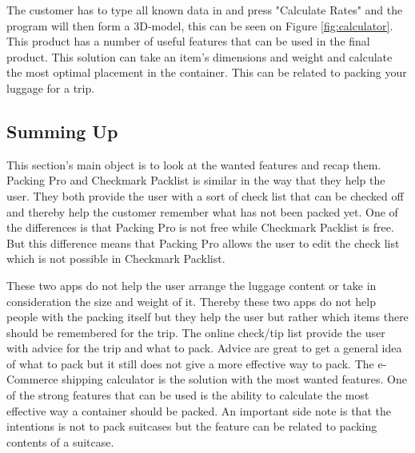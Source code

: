 
The customer has to type all known data in and press "Calculate Rates" and the program will then form a 3D-model, this can be seen on Figure \ref{fig:calculator}.
This product has a number of useful features that can be used in the final product. This solution can take an item's dimensions and weight and calculate the most optimal placement in the container. This can be related to packing your luggage for a trip.

\subsection{Summing Up}

This section's main object is to look at the wanted features and recap them.
Packing Pro and Checkmark Packlist is similar in the way that they help the user. They both provide the user with a sort of check list that can be checked off and thereby help the customer remember what has not been packed yet.
One of the differences is that Packing Pro is not free while Checkmark Packlist is free. But this difference means that Packing Pro allows the user to edit the check list which is not possible in Checkmark Packlist.

These two apps do not help the user arrange the luggage content or take in consideration the size and weight of it. Thereby these two apps do not help people with the packing itself but they help the user but rather which items there should be remembered for the trip.
The online check/tip list provide the user with advice for the trip and what to pack. Advice are great to get a general idea of what to pack but it still does not give a more effective way to pack.
The e-Commerce shipping calculator is the solution with the most wanted features. One of the strong features that can be used is the ability to calculate the most effective way a container should be packed. An important side note is that the intentions is not to pack suitcases but the feature can be related to packing contents of a suitcase.

